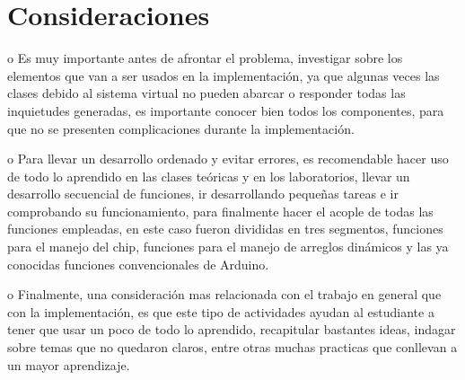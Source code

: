\documentclass{article}
\begin{document}
\section{Consideraciones} \label{contenido}
o	Es muy importante antes de afrontar el problema, investigar sobre los elementos que van a ser usados en la implementación, ya que algunas veces las clases debido al sistema virtual no pueden abarcar o responder todas las inquietudes generadas, es importante conocer bien todos los componentes, para que no se presenten complicaciones durante la implementación.\par
o	Para llevar un desarrollo ordenado y evitar errores, es recomendable hacer uso de todo lo aprendido en las clases teóricas y en los laboratorios, llevar un desarrollo secuencial de funciones, ir desarrollando pequeñas tareas e ir comprobando su funcionamiento, para finalmente hacer el acople de todas las funciones empleadas, en este caso fueron divididas en tres segmentos, funciones para el manejo del chip, funciones para el manejo de arreglos dinámicos y las ya conocidas funciones convencionales de Arduino.\par
o	Finalmente, una consideración mas relacionada con el trabajo en general que con la implementación, es que este tipo de actividades ayudan al estudiante a tener que usar un poco de todo lo aprendido, recapitular bastantes ideas, indagar sobre temas que no quedaron claros, entre otras muchas practicas que conllevan a un mayor aprendizaje.\par




\end{document}
